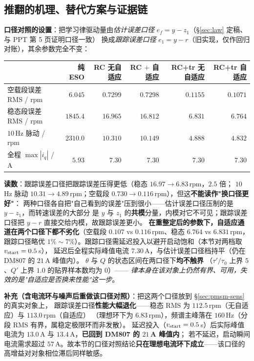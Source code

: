 \documentclass[11pt]{article}
\theoremstyle{remark}\newtheorem{remark}{注}
\newcommand{\ef}{e_f}
\begin{document}
\subsection{推翻的机理、替代方案与证据链}
\noindent\textbf{口径对照的设置}：把学习律驱动量由\emph{估计误差口径} $\ef=y-z_1$（§\ref{sec:law} 定稿、与 PPT 第 5 页证明口径一致）
换成\emph{跟踪误差口径} $e_1=y-r$（旧实现，仅作回归对账），其余参数完全不变：
\begin{center}
\footnotesize
\begin{tabular}{@{}lrrrrr@{}}
\toprule
 & 纯 ESO & RC 无自适应 & RC $+$ 自适应 & RC+tr 无自适应 & RC+tr 自适应\\
\midrule
空载段误差 RMS / rpm & $6.045$ & $0.7299$ & $0.7298$ & $0.1155$ & $\mathbf{0.1071}$\\
稳态段误差 RMS / rpm & $1845.4$ & $16.965$ & $16.812$ & $6.831$ & $\mathbf{6.764}$\\
$10$\,Hz 脉动 / rpm & $2310.0$ & $10.310$ & $10.149$ & $4.888$ & $4.832$\\
全程 $\max|i_q|$ / A & $5.93$ & $7.30$ & $7.30$ & $7.30$ & $7.30$\\
\bottomrule
\end{tabular}
\end{center}
\noindent\textbf{读数}：跟踪误差口径把跟踪误差压得更低（稳态 $16.97\to6.83$\,rpm，$2.5$ 倍；
$10$\,Hz 脉动 $10.31\to4.89$\,rpm；空载段 $0.730\to0.116$\,rpm），但这\textbf{不能读作"换口径更好"}：
两种口径各自把"自己看到的误差"压到很小——估计误差口径压制的是 $y-z_1$，而转速误差的大部分
是 $y$ 与 $z_1$ 的\textbf{共模}分量，内模对它不可见；跟踪误差口径把 $y-r$ 直接交给内模，故跟踪误差更小。
\textbf{在重整定后的参数下，自适应通道在两个口径下都不劣化}（空载段 $0.107$ vs $0.116$\,rpm、稳态 $6.764$ vs $6.831$\,rpm，
跟踪口径略优 $1\%\sim7\%$）。跟踪口径需延迟投入以避开启动饱和（本节对两档取 $v_{\rm start}=0.5$\,s），
延迟后全程实际峰值电流 $7.30$\,A，与估计误差口径档持平（仍在 DM807 的 $21$\,A 峰值内）。
$\theta$ 与 $Q$ 的状态区间在两口径下\textbf{均不触界}
（$\tau'/\tau_0$ 上界 $5$、$Q'$ 上界 $1.0$ 的贴界样本数均为 $0$）——
\emph{律本身在该对象上仍然有界、可用，失效的是"自适应是否换来性能"这一步}。
\vspace{1mm}

\noindent\textbf{补充（含电流环与噪声后重做该口径对照）}：把这两个口径放到 §\ref{sec:pmsm-sens} 的真实对象上，
跟踪误差口径\textbf{性能大幅退化}——稳态 RMS 为 $112.5$\,rpm（无自适应）与 $113.0$\,rpm（自适应）
（理想环下为 $6.83$\,rpm），频谱主峰落在 $160$\,Hz（分段 RMS 有界，属稳定极限环而非发散）。
延迟投入（$v_{\rm start}=0.5$\,s）后实际峰值电流为 $13.0$\,A 与 $13.4$\,A，\textbf{已回到 DM807 的 $21$\,A 峰值内}；
若不延迟，启动瞬间电流需求超过 $57$\,A。故本节的口径对照结论\textbf{只在理想电流环下成立}——该口径的高增益对对象相位滞后同样敏感。
\end{document}
